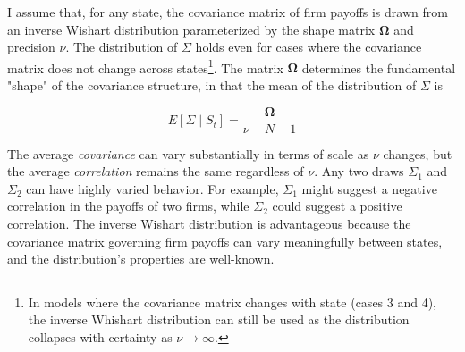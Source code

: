 \documentclass{article}
\begin{document}
\newcommand{\Shape}{\mathbf{\Omega}}

I assume that, for any state, the covariance matrix of firm payoffs is drawn from an inverse Wishart distribution parameterized by the shape matrix $\Shape$ and precision $\nu$. The distribution of $\Sigma$ holds even for cases where the covariance matrix does not change across states\footnote{In models where the covariance matrix changes with state (cases 3 and 4), the inverse Whishart distribution can still be used as the distribution collapses with certainty as $\nu \rightarrow \infty$.}. The matrix $\Shape$ determines the fundamental "shape" of the covariance structure, in that the mean of the distribution of $\Sigma$ is 

$$
E[\Sigma \mid S_t] = \frac{\Shape}{\nu - N - 1}
$$

The average \textit{covariance} can vary substantially in terms of scale as $\nu$ changes, but the average \textit{correlation} remains the same regardless of $\nu$. Any two draws $\Sigma_1$ and $\Sigma_2$ can have highly varied behavior. For example, $\Sigma_1$ might suggest a negative correlation in the payoffs of two firms, while $\Sigma_2$ could suggest a positive correlation. The inverse Wishart distribution is advantageous because the covariance matrix governing firm payoffs can vary meaningfully between states, and the distribution's properties are well-known.
\end{document}
